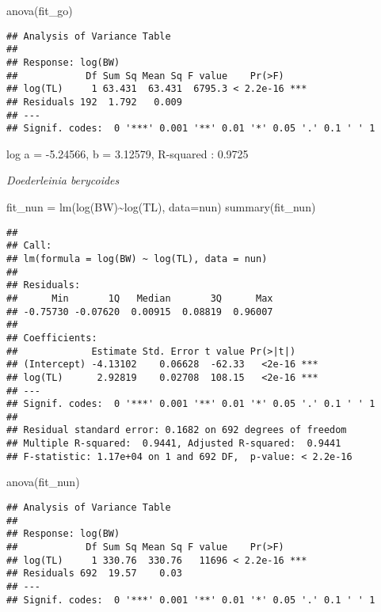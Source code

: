 \documentclass[
]{article}
\newenvironment{Shaded}{\begin{snugshade}}{\end{snugshade}}
\newcommand{\AttributeTok}[1]{\textcolor[rgb]{0.77,0.63,0.00}{#1}}
\newcommand{\FunctionTok}[1]{\textcolor[rgb]{0.00,0.00,0.00}{#1}}
\newcommand{\NormalTok}[1]{#1}
\newcommand{\OtherTok}[1]{\textcolor[rgb]{0.56,0.35,0.01}{#1}}
\newcommand{\SpecialCharTok}[1]{\textcolor[rgb]{0.00,0.00,0.00}{#1}}
\begin{document}
\begin{Shaded}
\begin{Highlighting}[]
\FunctionTok{anova}\NormalTok{(fit\_go)}
\end{Highlighting}
\end{Shaded}

\begin{verbatim}
## Analysis of Variance Table
## 
## Response: log(BW)
##            Df Sum Sq Mean Sq F value    Pr(>F)    
## log(TL)     1 63.431  63.431  6795.3 < 2.2e-16 ***
## Residuals 192  1.792   0.009                      
## ---
## Signif. codes:  0 '***' 0.001 '**' 0.01 '*' 0.05 '.' 0.1 ' ' 1
\end{verbatim}

log a = -5.24566, b = 3.12579, R-squared : 0.9725

\emph{Doederleinia berycoides}

\begin{Shaded}
\begin{Highlighting}[]
\NormalTok{fit\_nun }\OtherTok{=} \FunctionTok{lm}\NormalTok{(}\FunctionTok{log}\NormalTok{(BW)}\SpecialCharTok{\textasciitilde{}}\FunctionTok{log}\NormalTok{(TL), }\AttributeTok{data=}\NormalTok{nun)}
\FunctionTok{summary}\NormalTok{(fit\_nun)}
\end{Highlighting}
\end{Shaded}

\begin{verbatim}
## 
## Call:
## lm(formula = log(BW) ~ log(TL), data = nun)
## 
## Residuals:
##      Min       1Q   Median       3Q      Max 
## -0.75730 -0.07620  0.00915  0.08819  0.96007 
## 
## Coefficients:
##             Estimate Std. Error t value Pr(>|t|)    
## (Intercept) -4.13102    0.06628  -62.33   <2e-16 ***
## log(TL)      2.92819    0.02708  108.15   <2e-16 ***
## ---
## Signif. codes:  0 '***' 0.001 '**' 0.01 '*' 0.05 '.' 0.1 ' ' 1
## 
## Residual standard error: 0.1682 on 692 degrees of freedom
## Multiple R-squared:  0.9441, Adjusted R-squared:  0.9441 
## F-statistic: 1.17e+04 on 1 and 692 DF,  p-value: < 2.2e-16
\end{verbatim}

\begin{Shaded}
\begin{Highlighting}[]
\FunctionTok{anova}\NormalTok{(fit\_nun)}
\end{Highlighting}
\end{Shaded}

\begin{verbatim}
## Analysis of Variance Table
## 
## Response: log(BW)
##            Df Sum Sq Mean Sq F value    Pr(>F)    
## log(TL)     1 330.76  330.76   11696 < 2.2e-16 ***
## Residuals 692  19.57    0.03                      
## ---
## Signif. codes:  0 '***' 0.001 '**' 0.01 '*' 0.05 '.' 0.1 ' ' 1
\end{verbatim}
\end{document}
